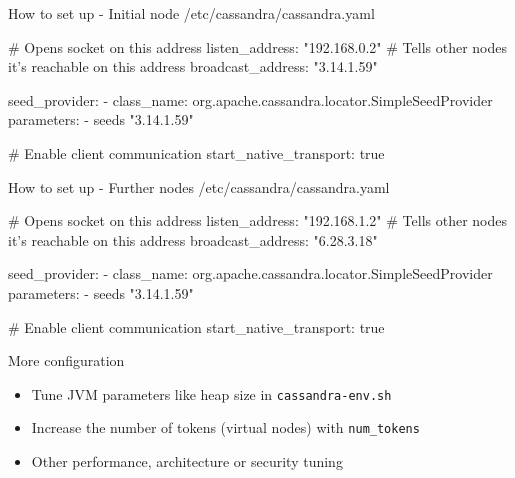 \documentclass[
  10pt
]{beamer}
\begin{document}
\begin{frame}[fragile]{How to set up - Initial node}
/etc/cassandra/cassandra.yaml
\begin{semiverbatim}
# Opens socket on this address
listen_address: "192.168.0.2"
# Tells other nodes it's reachable on this address
broadcast_address: "3.14.1.59"

seed_provider:
  - class_name: org.apache.cassandra.locator.SimpleSeedProvider
    parameters:
      - seeds "3.14.1.59"

# Enable client communication
start_native_transport: true
\end{semiverbatim}
\end{frame}

\begin{frame}[fragile]{How to set up - Further nodes}
  /etc/cassandra/cassandra.yaml
  \begin{semiverbatim}
# Opens socket on this address
listen_address: "192.168.1.2"
# Tells other nodes it's reachable on this address
broadcast_address: "6.28.3.18"

seed_provider:
  - class_name: org.apache.cassandra.locator.SimpleSeedProvider
    parameters:
      - seeds "3.14.1.59"

# Enable client communication
start_native_transport: true
  \end{semiverbatim}
\end{frame}

\begin{frame}{More configuration}
  \begin{itemize}
    \item Tune JVM parameters like heap size in \lstinline{cassandra-env.sh}
    \item Increase the number of tokens (virtual nodes) with \lstinline{num_tokens}
    \item Other performance, architecture or security tuning
  \end{itemize}
\end{frame}
\end{document}
